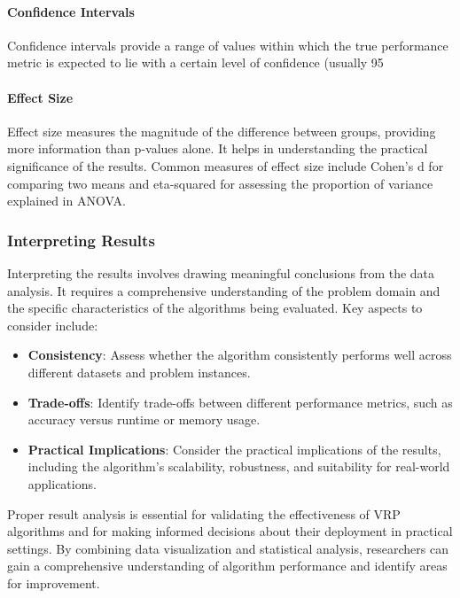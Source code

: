 \documentclass[
]{article}
\begin{document}
\paragraph{Confidence Intervals}

Confidence intervals provide a range of values within which the true performance metric is expected to lie with a certain level of confidence (usually 95%

\paragraph{Effect Size}

Effect size measures the magnitude of the difference between groups, providing more information than p-values alone. It helps in understanding the practical significance of the results. Common measures of effect size include Cohen's d for comparing two means and eta-squared for assessing the proportion of variance explained in ANOVA.

\subsubsection{Interpreting Results}

Interpreting the results involves drawing meaningful conclusions from the data analysis. It requires a comprehensive understanding of the problem domain and the specific characteristics of the algorithms being evaluated. Key aspects to consider include:

\begin{itemize}
    \item \textbf{Consistency}: Assess whether the algorithm consistently performs well across different datasets and problem instances.
    \item \textbf{Trade-offs}: Identify trade-offs between different performance metrics, such as accuracy versus runtime or memory usage.
    \item \textbf{Practical Implications}: Consider the practical implications of the results, including the algorithm's scalability, robustness, and suitability for real-world applications.
\end{itemize}

Proper result analysis is essential for validating the effectiveness of VRP algorithms and for making informed decisions about their deployment in practical settings. By combining data visualization and statistical analysis, researchers can gain a comprehensive understanding of algorithm performance and identify areas for improvement.
\end{document}
